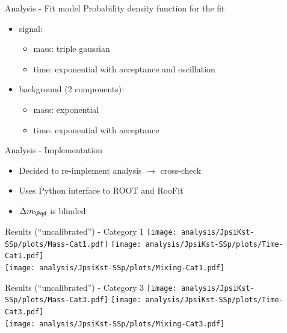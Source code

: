 \begin{frame}{Analysis - Fit model}
  Probability density function for the fit
  \begin{itemize}
    \item signal:
      \begin{itemize}
        \item mass: triple gaussian
        \item time: exponential with acceptance and oscillation
      \end{itemize}
    \item background (2 components):
      \begin{itemize}
        \item mass: exponential
        \item time: exponential with acceptance
      \end{itemize}
  \end{itemize}
\end{frame}


\begin{frame}{Analysis - Implementation}
  \begin{itemize}
  \item Decided to re-implement analysis $\rightarrow$ cross-check
  \item Uses Python interface to ROOT and RooFit
  \item $\difference{m_{\Pqd}}$ is blinded
  \end{itemize}
\end{frame}

\begin{frame}[plain]{Results (\enquote{uncalibrated}) - Category 1}
  \centering
  \texttt{[image: analysis/JpsiKst-SSp/plots/Mass-Cat1.pdf]}
  \texttt{[image: analysis/JpsiKst-SSp/plots/Time-Cat1.pdf]} \\
  \texttt{[image: analysis/JpsiKst-SSp/plots/Mixing-Cat1.pdf]}
\end{frame}

\begin{frame}[plain]{Results (\enquote{uncalibrated}) - Category 3}
  \centering
  \texttt{[image: analysis/JpsiKst-SSp/plots/Mass-Cat3.pdf]}
  \texttt{[image: analysis/JpsiKst-SSp/plots/Time-Cat3.pdf]} \\
  \texttt{[image: analysis/JpsiKst-SSp/plots/Mixing-Cat3.pdf]}
\end{frame}

